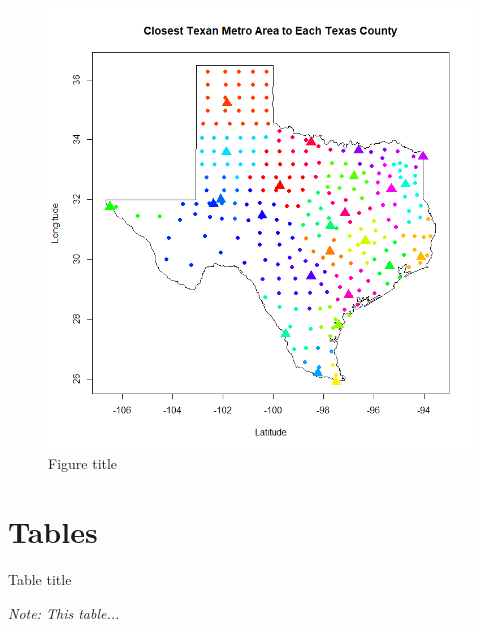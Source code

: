 \documentclass[12pt]{article}
\begin{document}
\begin{figure}[tbh]
	\caption{Figure title}\label{fig1}
		\includegraphics[width=\linewidth, keepaspectratio]{"Texas_county_cost_of_living_map.png"}
		
\end{figure}

\section{Tables}

\begin{table}[tbh]
    \caption{Table title}
    \label{table1}
        \begin{center}
        \end{center}
    \textit{\scriptsize{}Note: This table...}{\scriptsize \par}
    \end{table}
\end{document}

